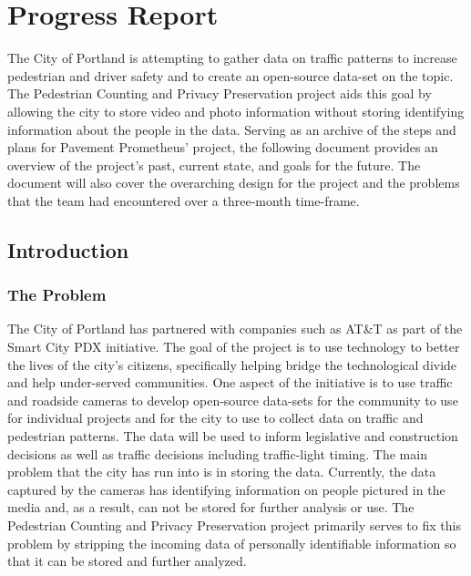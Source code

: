 \chapter{Progress Report}
The City of Portland is attempting to gather data on traffic patterns to increase pedestrian and driver safety and to create an open-source data-set on the topic. The Pedestrian Counting and Privacy Preservation project aids this goal by allowing the city to store video and photo information without storing identifying information about the people in the data. Serving as an archive of the steps and plans for Pavement Prometheus’ project, the following document provides an overview of the project's past, current state, and goals for the future. The document will also cover the overarching design for the project and the problems that the team had encountered over a three-month time-frame. 
\section{Introduction}
\subsection{The Problem}
The City of Portland has partnered with companies such as AT\&T as part of the Smart City PDX initiative. The goal of the project is to use technology to better the lives of the city's citizens, specifically helping bridge the technological divide and help under-served communities. One aspect of the initiative is to use traffic and roadside cameras to develop open-source data-sets for the community to use for individual projects and for the city to use to collect data on traffic and pedestrian patterns. The data will be used to inform legislative and construction decisions as well as traffic decisions including traffic-light timing. The main problem that the city has run into is in storing the data. Currently, the data captured by the cameras has identifying information on people pictured in the media and, as a result, can not be stored for further analysis or use. The Pedestrian Counting and Privacy Preservation project primarily serves to fix this problem by stripping the incoming data of personally identifiable information so that it can be stored and further analyzed.


